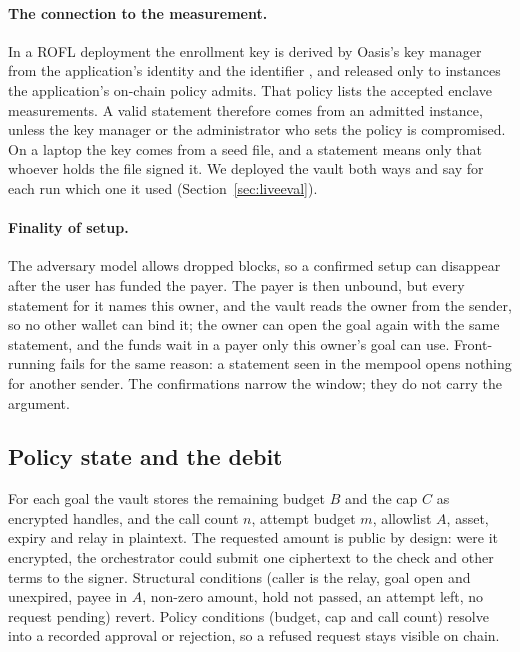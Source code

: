 \paragraph{The connection to the measurement.} In a ROFL deployment the enrollment key is derived by Oasis's key
manager from the application's identity and the identifier , and released only to
instances the application's on-chain policy admits. That policy lists the accepted enclave measurements. A valid
statement therefore comes from an admitted instance, unless the key manager or the administrator who sets the policy
is compromised. On a laptop the key comes from a seed file, and a statement means only that whoever holds the file
signed it. We deployed the vault both ways and say for each run which one it used (Section~\ref{sec:liveeval}).

\paragraph{Finality of setup.} The adversary model allows dropped blocks, so a confirmed setup can disappear after
the user has funded the payer. The payer is then unbound, but every statement for it names this owner, and the vault
reads the owner from the sender, so no other wallet can bind it; the owner can open the goal again with the same
statement, and the funds wait in a payer only this owner's goal can use. Front-running fails for the same reason: a
statement seen in the mempool opens nothing for another sender. The confirmations narrow the window; they do not
carry the argument.

\subsection{Policy state and the debit}
\label{sec:writeahead}

For each goal the vault stores the remaining budget $B$ and the cap $C$ as encrypted handles, and the call count
$n$, attempt budget $m$, allowlist $A$, asset, expiry and relay in plaintext. The requested amount is public by
design: were it encrypted, the orchestrator could submit one ciphertext to the check and other terms to the signer.
Structural conditions (caller is the relay, goal open and unexpired, payee in $A$, non-zero amount, hold not passed,
an attempt left, no request pending) revert. Policy conditions (budget, cap and call count) resolve into a recorded
approval or rejection, so a refused request stays visible on chain.

